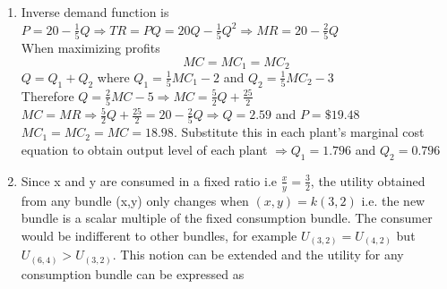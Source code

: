 \documentclass{article}
\begin{document}
\begin{enumerate}
\begin{center}
        \end{center}
        A per unit tax shifts the equilibrium from $(37.5,32.5)$ to $(18.75,36.25)$. The producers charge \$36.25 for the product but only keep \$26.25 with them due to tax. The burden on consumers and producers is given by vertical distances A and B respectively as shown above.  
        \begin{enumerate}[label=(\roman*)]
            \item Consumer burden = \$3.75
            \item Producer burden = \$6.25
        \end{enumerate}        
    \item
        Inverse demand function is $P=20-\frac{1}{5}Q \Rightarrow TR=PQ=20Q-\frac{1}{5}Q^2 \Rightarrow MR=20-\frac{2}{5}Q$\\
        When maximizing profits
        \[
        MC=MC_1=MC_2
        \]
        $Q=Q_1+Q_2$ where $Q_1 = \frac{1}{5}MC_1-2$ and $Q_2=\frac{1}{5}MC_2-3$\\
        Therefore $Q=\frac{2}{5}MC-5 \Rightarrow MC=\frac{5}{2}Q+\frac{25}{2}$ \\
        $MC=MR \Rightarrow \frac{5}{2}Q+\frac{25}{2} = 20-\frac{2}{5}Q \Rightarrow Q=2.59$ and $P=\$19.48$ \\
        $MC_1 = MC_2 = MC = 18.98$. Substitute this in each plant's marginal cost equation to obtain output level of each plant
        $\Rightarrow Q_1=1.796$ and $Q_2=0.796$
    \item 
        Since x and y are consumed in a fixed ratio i.e $\frac{x}{y} = \frac{3}{2}$, the utility obtained from any bundle (x,y) only changes when $(x,y)=k(3,2)$ i.e. the new bundle is a scalar multiple of the fixed consumption bundle. The consumer would be indifferent to other bundles, for example $U_{(3,2)} = U_{(4,2)}$ but $U_{(6,4)} > U_{(3,2)}$. This notion can be extended and the utility for any consumption bundle can be expressed as 

\end{enumerate}
\end{document}
